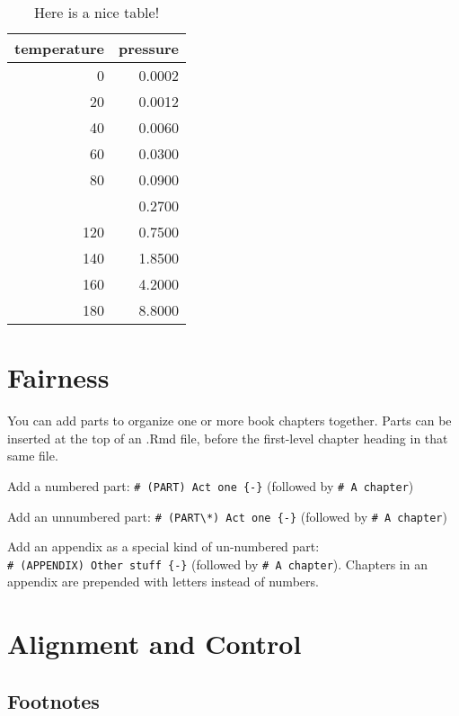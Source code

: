 \documentclass[
]{book}
\theoremstyle{definition}
\theoremstyle{definition}
\theoremstyle{definition}
\theoremstyle{definition}
\theoremstyle{remark}
\begin{document}
\begin{table}

\caption{\label{tab:nice-tab}Here is a nice table!}
\centering
\begin{tabular}[t]{rr}
\toprule
temperature & pressure\\
\midrule
0 & 0.0002\\
20 & 0.0012\\
40 & 0.0060\\
60 & 0.0300\\
80 & 0.0900\\
\addlinespace
100 & 0.2700\\
120 & 0.7500\\
140 & 1.8500\\
160 & 4.2000\\
180 & 8.8000\\
\bottomrule
\end{tabular}
\end{table}

\hypertarget{ch-fairness}{%
\chapter{Fairness}\label{ch-fairness}}

You can add parts to organize one or more book chapters together. Parts can be inserted at the top of an .Rmd file, before the first-level chapter heading in that same file.

Add a numbered part: \texttt{\#\ (PART)\ Act\ one\ \{-\}} (followed by \texttt{\#\ A\ chapter})

Add an unnumbered part: \texttt{\#\ (PART\textbackslash{}*)\ Act\ one\ \{-\}} (followed by \texttt{\#\ A\ chapter})

Add an appendix as a special kind of un-numbered part: \texttt{\#\ (APPENDIX)\ Other\ stuff\ \{-\}} (followed by \texttt{\#\ A\ chapter}). Chapters in an appendix are prepended with letters instead of numbers.

\hypertarget{ch-alignment-and-control}{%
\chapter{Alignment and Control}\label{ch-alignment-and-control}}

\hypertarget{footnotes}{%
\section{Footnotes}\label{footnotes}}
\end{document}
